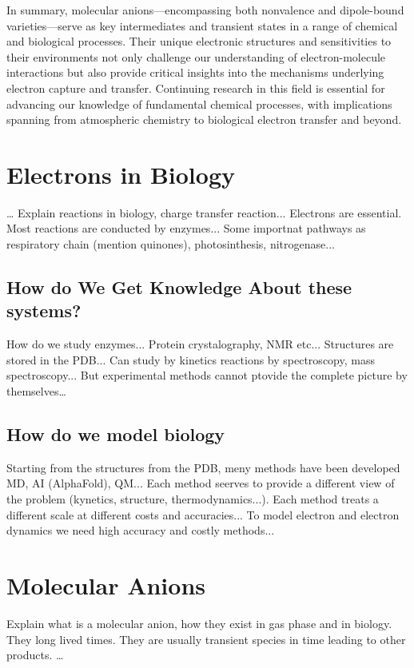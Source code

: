 In summary, molecular anions—encompassing both nonvalence and dipole-bound varieties—serve as key intermediates and transient states in a range of chemical and biological processes. Their unique electronic structures and sensitivities to their environments not only challenge our understanding of electron-molecule interactions but also provide critical insights into the mechanisms underlying electron capture and transfer. Continuing research in this field is essential for advancing our knowledge of fundamental chemical processes, with implications spanning from atmospheric chemistry to biological electron transfer and beyond.



\section{Electrons in Biology}
\ldots
Explain reactions in biology, charge transfer reaction... Electrons are essential. Most reactions are conducted by enzymes... Some importnat pathways as respiratory chain (mention quinones), photosinthesis, nitrogenase...
\subsection{How do We Get Knowledge About these systems?}
How do we study enzymes... Protein crystalography, NMR etc... Structures are stored in the PDB... Can study by kinetics reactions by spectroscopy, mass spectroscopy... But experimental methods cannot ptovide the complete picture by themselves\dots

\subsection{How do we model biology}
Starting from the structures from the PDB, meny methods have been developed MD, AI (AlphaFold), QM... Each method seerves to provide a different view of the problem (kynetics, structure, thermodynamics...). Each method treats a different scale at different costs and accuracies... To model electron and electron dynamics we need high accuracy and costly methods...

\section{Molecular Anions}
Explain what is a molecular anion, how they exist in gas phase and in biology. They long lived times. They are usually transient species in time leading to other products.
\ldots
